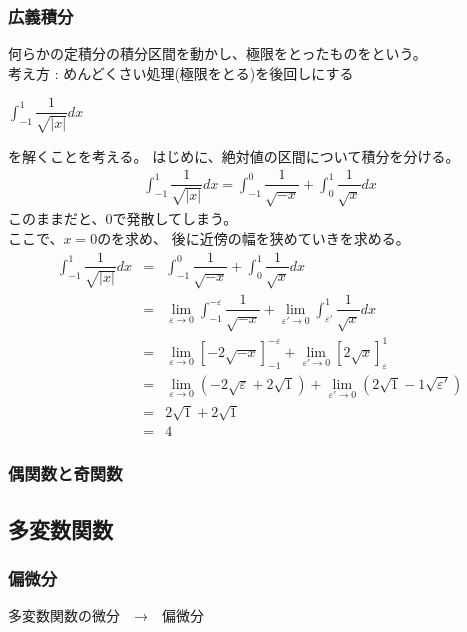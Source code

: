 \documentclass[a4paper]{jsarticle}
\begin{document}
\subsubsection{広義積分}
何らかの定積分の積分区間を動かし、極限をとったものをという。\\
考え方 : めんどくさい処理(極限をとる)を後回しにする
\begin{center}
    $\displaystyle\int ^1_{-1} \dfrac{1}{\sqrt{|x|}}dx$
\end{center}
を解くことを考える。
はじめに、絶対値の区間について積分を分ける。
\begin{eqnarray*}
    \displaystyle\int ^1_{-1} \dfrac{1}{\sqrt{|x|}}dx=\int ^0_{-1} \dfrac{1}{\sqrt{-x}}+\int ^1_{0} \dfrac{1}{\sqrt{x}}dx
\end{eqnarray*}
このままだと、$0$で発散してしまう。\\
ここで、$x=0$のを求め、
後に近傍の幅を狭めていきを求める。
\begin{eqnarray*}
    \displaystyle
    \int ^1_{-1} \dfrac{1}{\sqrt{|x|}}dx&=&\int ^0_{-1} \dfrac{1}{\sqrt{-x}}+\int ^1_{0} \dfrac{1}{\sqrt{x}}dx\\
    &=&\lim_{\varepsilon\rightarrow 0}\int ^{-\varepsilon}_{-1} \dfrac{1}{\sqrt{-x}}+\lim_{\varepsilon'\rightarrow 0}\int ^1_{\varepsilon'} \dfrac{1}{\sqrt{x}}dx\\
    &=&\lim_{\varepsilon\rightarrow 0}\left[-2\sqrt{-x}\right]^{-\varepsilon}_{-1}+\lim_{\varepsilon'\rightarrow0}\left[2\sqrt{x}\right]^{1}_{\varepsilon}\\
    &=&\lim_{\varepsilon\rightarrow 0}\left(-2\sqrt{\varepsilon}+2\sqrt{1}\right)+\lim_{\varepsilon'\rightarrow0}\left(2\sqrt{1}-1\sqrt{\varepsilon'}\right)\\
    &=&2\sqrt{1}+2\sqrt{1}\\
    &=&4
\end{eqnarray*}
\subsubsection{偶関数と奇関数}

\subsection{多変数関数}
\subsubsection{偏微分}
多変数関数の微分　→　偏微分
\end{document}
